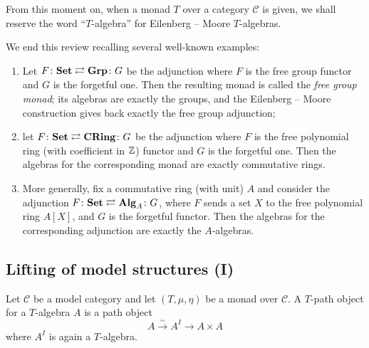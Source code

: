 \begin{refsection}
\begin{rmk}
From this moment on, when a monad $T$ over a category $\mathcal C$ is given, we shall reserve the word ``$T$-algebra'' for Eilenberg -- Moore $T$-algebras.
\end{rmk}

We end this review recalling several well-known examples:

\begin{eg}
\begin{enumerate}
\item Let $F \colon \mathbf{Set} \rightleftarrows \mathbf{Grp} \colon G$ be the adjunction where $F$ is the free group functor and $G$ is the forgetful one. Then the resulting monad is called the \emph{free group monad}; its algebras are exactly the groups, and the Eilenberg -- Moore construction gives back exactly the free group adjunction;
\item let $F \colon \mathbf{Set} \rightleftarrows \mathbf{CRing} \colon G$ be the adjunction where $F$ is the free polynomial ring (with coefficient in $\mathbb{Z}$) functor and $G$ is the forgetful one. Then the algebras for the corresponding monad are exactly commutative rings.
\item More generally, fix a commutative ring (with unit) $A$ and consider the adjunction $F \colon \mathbf{Set} \rightleftarrows \mathbf{Alg}_A \colon G$, where $F$ sends a set $X$ to the free polynomial ring $A[X]$, and $G$ is the forgetful functor. Then the algebras for the corresponding adjunction are exactly the $A$-algebras.
\end{enumerate}
\end{eg}

\subsection{Lifting of model structures (I)}

\begin{defin}
Let $\mathcal C$ be a model category and let $(T,\mu,\eta)$ be a monad over $\mathcal C$. A $T$-path object for a $T$-algebra $A$ is a path object
\[
A \xrightarrow{\sim} A^I \to A \times A
\]
where $A^I$ is again a $T$-algebra.
\end{defin}


\end{refsection}
